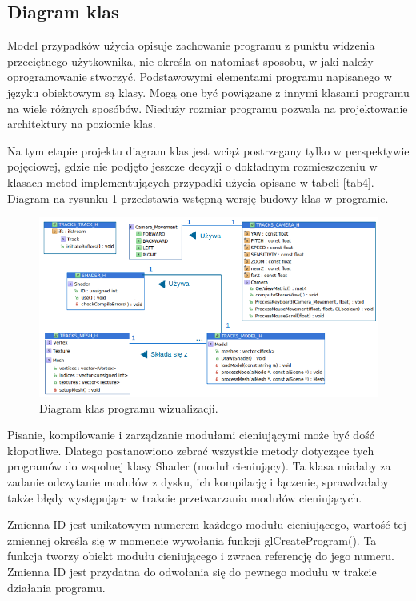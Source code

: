 \subsection{Diagram klas}
Model przypadków użycia opisuje zachowanie programu z punktu widzenia przeciętnego użytkownika, nie określa on natomiast sposobu, w jaki
należy oprogramowanie stworzyć. Podstawowymi elementami programu napisanego w języku obiektowym są klasy. Mogą one być powiązane z innymi klasami programu na wiele różnych sposóbów. Nieduży rozmiar programu pozwala na projektowanie architektury na poziomie klas.

Na tym etapie projektu diagram klas jest wciąż postrzegany tylko w perspektywie pojęciowej, gdzie nie podjęto jeszcze decyzji o dokładnym rozmieszczeniu w klasach metod implementujących przypadki użycia opisane w tabeli \ref{tab4}. Diagram na rysunku \ref{rys24} przedstawia wstępną wersję budowy klas w programie. 

\begin{figure}[H]
		\centering
 		\includegraphics[width=16.0cm]{diagramKlas.png}
    	\caption{Diagram klas programu wizualizacji.}
 		\label{rys24}
\end{figure}


Pisanie, kompilowanie i zarządzanie modułami cieniującymi może być dość kłopotliwe. Dlatego postanowiono zebrać wszystkie metody dotyczące tych programów do wspolnej klasy Shader (moduł cieniujący). Ta klasa miałaby za zadanie odczytanie modułów z dysku, ich kompilację i łączenie, sprawdzałaby także błędy występujące w trakcie przetwarzania modułów cieniujących.

Zmienna ID jest unikatowym numerem każdego modułu cieniującego, wartość tej zmiennej określa się w momencie wywołania funkcji glCreateProgram(). Ta funkcja tworzy obiekt modułu cieniującego i zwraca referencję do jego numeru. Zmienna ID jest przydatna do odwołania się do pewnego modułu w trakcie działania programu.


